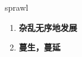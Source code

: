 
\begin{frame}
{\huge sprawl}
\begin{center}
\begin{enumerate}\Large
  \item \textbf{杂乱无序地发展}
  \item \textbf{蔓生，蔓延}
\end{enumerate}
\end{center}
\end{frame}
